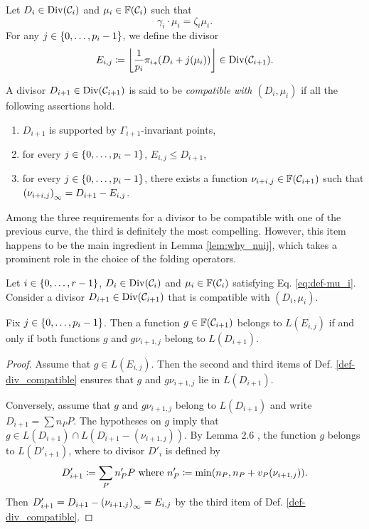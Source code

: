 \documentclass[10pt]{article}
\begin{document}
\begin{definition}\label{def-div_compatible}
	Let $D_i \in \operatorname{Div}(\mathcal{C}_i)$ and $\mu_i \in \mathbb{F}(\mathcal{C}_i)$ such that 
	\begin{equation}\label{eq:def-mu_i}
		\gamma_i \cdot \mu_i = \zeta_i \mu_i.
	\end{equation} For any $j \in \left\{0,\dots,p_i-1\right\}$, we define the divisor 
	\[	E_{i,j}\coloneqq \left\lfloor\frac{1}{p_i}{\pi_i}_*( D_i + j(\mu_i))\right\rfloor \in \operatorname{Div}(\mathcal{C}_{i+1}).\]
	
	A divisor $D_{i+1} \in \operatorname{Div}(\mathcal{C}_{i+1})$ is said to be \emph{compatible with $(D_i,\mu_i)$} if all the following assertions hold.
	\begin{enumerate}
		\item $D_{i+1}$ is supported by $\Gamma_{i+1}$-invariant points, 
		\item for every $j \in \left\{0,\dots,p_i-1\right\}$, $E_{i,j} \leq D_{i+1}$,
		\item  for every $j \in \left\{0,\dots,p_i-1\right\}$, there exists a function $\nu_{i+i,j}\in \mathbb{F}(\mathcal{C}_{i+1})$ such that $\left( \nu_{i+i,j} \right)_\infty=D_{i+1} - E_{i,j}$.	
	\end{enumerate}
\end{definition}

Among the three requirements for a divisor to be compatible with one of the previous curve, the third is definitely the most compelling.  However, this item happens to be the main ingredient in Lemma \ref{lem:why_nuij}, which takes a prominent role in the choice of the folding operators.


\begin{lemma}\label{lem:why_nuij}
	Let $i \in \left\{0,\dots,r-1\right\}$, $D_i \in \operatorname{Div}(\mathcal{C}_i)$ and $\mu_i \in \mathbb{F}(\mathcal{C}_i)$ satisfying Eq. \eqref{eq:def-mu_i}. Consider a divisor $D_{i+1}\in\operatorname{Div}(\mathcal{C}_{i+1})$ that is compatible with $(D_i,\mu_i)$.
	
	Fix $j \in \left\{0,\dots,p_i-1\right\}$. Then a function $g\in \mathbb{F}(\mathcal{C}_{i+1})$ belongs to $L(E_{i,j})$ if and only if both functions $g$ and $g \nu_{i+1,j}$ belong to $L(D_{i+1})$.
\end{lemma}

\begin{proof} Assume that $g \in L(E_{i,j})$. Then the second and third items of Def. \ref{def-div_compatible} ensures that $g$ and $g\nu_{i+1,j}$ lie in $L(D_{i+1})$.
	
	Conversely, assume that $g$ and $g\nu_{i+1,j}$ belong to  $L(D_{i+1})$ and write $D_{i+1} = \sum n_P P$. The hypotheses on $g$ imply that {$g \in L(D_{i+1}) \cap L(D_{i+1} - (\nu_{i+1,j}))$}. By Lemma 2.6 \cite{MP93}, the function $g$ belongs to $L(D'_{i+1})$, where to divisor $D'_i$ is defined by
	\[D'_{i+1} \coloneqq \sum_P n'_P P \text{ where } n'_P \coloneqq \min(n_P,n_P+v_P(\nu_{i+1,j})).\]
	Then $D'_{i+1} = D_{i+1} - \left( \nu_{i+1,j} \right)_\infty = E_{i,j}$ by the third item of Def. \ref{def-div_compatible}.
\end{proof}
\end{document}
